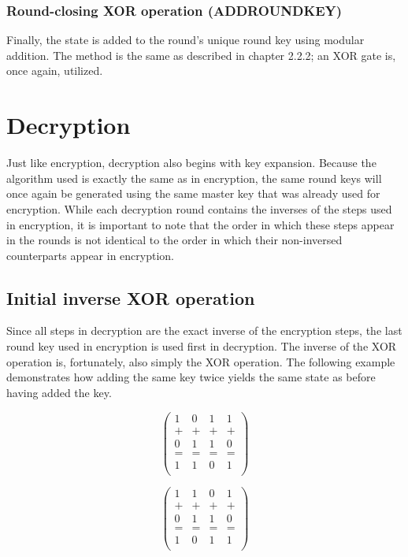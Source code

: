 \documentclass[12pt]{report}
\theoremstyle{definition}
\theoremstyle{remark}
\begin{document}
\subsubsection{Round-closing XOR operation (ADDROUNDKEY)}
Finally, the state is added to the round's unique round key using modular addition. The method is the same as described in chapter 2.2.2; an XOR gate is, once again, utilized.

\section{Decryption}
Just like encryption, decryption also begins with key expansion. Because the algorithm used is exactly the same as in encryption, the same round keys will once again be generated using the same master key that was already used for encryption. While each decryption round contains the inverses of the steps used in encryption, it is important to note that the order in which these steps appear in the rounds is not identical to the order in which their non-inversed counterparts appear in encryption.

\subsection{Initial inverse XOR operation}
Since all steps in decryption are the exact inverse of the encryption steps, the last round key used in encryption is used first in decryption\cite{RoundKeyInverse}. The inverse of the XOR operation is, fortunately, also simply the XOR operation. The following example demonstrates how adding the same key twice yields the same state as before having added the key.

\[
\left( \begin{array}{cccc}
1 & 0 & 1 & 1 \\
+ & + & + & + \\
0 & 1 & 1 & 0 \\
= & = & = & = \\
1 & 1 & 0 & 1 \\
\end{array} \right)
\]

\[
\left( \begin{array}{cccc}
1 & 1 & 0 & 1 \\
+ & + & + & + \\
0 & 1 & 1 & 0 \\
= & = & = & = \\
1 & 0 & 1 & 1 \\
\end{array} \right)
\]
\end{document}
